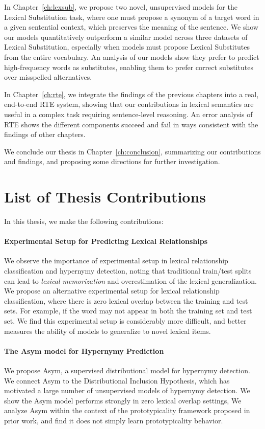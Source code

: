 In Chapter~\ref{ch:lexsub}, we propose two novel, unsupervised models for
the Lexical Substitution task, where one must propose a synonym of a target word in a given
    sentential context, which preserves the meaning of the sentence. We show our models quantitatively outperform
a similar model across three datasets of Lexical Substitution, especially
when models must propose Lexical Substitutes from the entire vocabulary.
An analysis of our models show they prefer to predict high-frequency words
as substitutes, enabling them to prefer correct substitutes over
misspelled alternatives.

In Chapter~\ref{ch:rte}, we integrate the findings of the previous chapters
into a real, end-to-end RTE system, showing that our contributions in lexical
semantics are useful in a complex task requiring sentence-level reasoning.
An error analysis of RTE shows the different components succeed and fail
in ways consistent with the findings of other chapters.

We conclude our thesis in Chapter~\ref{ch:conclusion}, summarizing our
contributions and findings, and proposing some directions for further
investigation.


\section{List of Thesis Contributions}

\noindent In this thesis, we make the following contributions:

\paragraph{Experimental Setup for Predicting Lexical Relationships}
We observe the importance of experimental setup in lexical relationship
    classification and hypernymy detection, noting that traditional train/test
    splits can lead to {\em lexical memorization} and overestimation of the
    lexical generalization. We propose an alternative experimental setup for lexical relationship
    classification, where there is zero lexical overlap between the training
    and test sets. For example, if the word  may not appear in both
    the training set and test set. We find this experimental setup is considerably more
    difficult, and better measures the ability of models to generalize to
    novel lexical items.

\paragraph{The Asym model for Hypernymy Prediction}
We propose Asym, a supervised distributional model for hypernymy
    detection. We connect Asym to the Distributional Inclusion Hypothesis, which
    has motivated a large number of unsupervised models of hypernymy detection.
    We show the Asym model performs strongly in zero lexical overlap settings,
We analyze Asym within the context of the prototypicality framework
    proposed in prior work, and find it does not simply learn prototypicality
    behavior.


